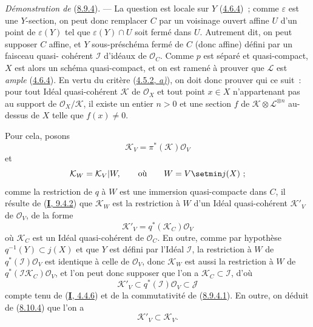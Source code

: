 \begin{env}[8.10.6]
\label{II.8.10.6-fr}
\emph{Démonstration de} (\hyperref[II.8.9.4-fr]{8.9.4}). --- La question est
locale sur $Y$ (\hyperref[II.4.6.4-fr]{4.6.4})~; comme $\varepsilon$ est une
$Y$-section, on peut donc remplacer $C$ par un voisinage ouvert affine $U$
d'un point de $\varepsilon(Y)$ tel que $\varepsilon(Y)\cap U$ soit fermé dans
$U$. Autrement dit, on peut supposer $C$ affine, et $Y$ sous-préschéma fermé
de $C$ (donc affine) défini par un faisceau quasi-%
cohérent $\mathcal{I}$ d'idéaux de $\mathcal{O}_C$. Comme $p$ est séparé et
quasi-compact, $X$ est alors un schéma quasi-compact, et on est ramené à
prouver que $\mathcal{L}$ est \emph{ample}
(\hyperref[II.4.6.4-fr]{4.6.4}). En vertu du critère
(\hyperref[II.4.5.2-fr]{4.5.2, \emph{a)}}), on doit donc prouver qui ce suit~: pour
tout Idéal quasi-cohérent $\mathcal{K}$ de $\mathcal{O}_X$ et tout point
$x\in X$ n'appartenant pas au support de $\mathcal{O}_X/\mathcal{K}$, il
existe un entier $n>0$ et une section $f$ de
$\mathcal{K}\otimes\mathcal{L}^{\otimes n}$ au-dessus de $X$ telle que
$f(x)\neq0$.

Pour cela, posons
\[
  \mathcal{K}_V=\pi^*(\mathcal{K})\mathcal{O}_V
\]
et
\[
  \mathcal{K}_W=\mathcal{K}_V|W,\qquad\hbox{où}\qquad W=V\setmin j(X)~;
\]
comme la restriction de $q$ à $W$ est une immersion quasi-compacte dans $C$,
il résulte de (\hyperref[I.9.4.2-fr]{\textbf{I}, 9.4.2}) que $\mathcal{K}_W$ est la
restriction à $W$ d'un Idéal quasi-cohérent $\mathcal{K}'_V$ de
$\mathcal{O}_V$, de la forme
\[
  \mathcal{K}'_V=q^*(\mathcal{K}_C)\mathcal{O}_V
\]
où $\mathcal{K}_C$ est un Idéal quasi-cohérent de $\mathcal{O}_C$. En outre,
comme par hypothèse $q^{-1}(Y)\subset j(X)$ et que $Y$ est défini par l'Idéal
$\mathcal{I}$, la restriction à $W$ de $q^*(\mathcal{I})\mathcal{O}_V$ est
identique à celle de $\mathcal{O}_V$, donc $\mathcal{K}_W$ est aussi la
restriction à $W$ de $q^*(\mathcal{I}\mathcal{K}_C)\mathcal{O}_V$, et l'on
peut donc supposer que l'on a $\mathcal{K}_C\subset\mathcal{I}$, d'où
\begin{equation}
\label{II.8.10.6.1-fr}
  \mathcal{K}'_V\subset q^*(\mathcal{I})\mathcal{O}_V\subset\mathcal{J}
\tag{8.10.6.1}
\end{equation}
compte tenu de (\hyperref[I.4.4.6-fr]{\textbf{I}, 4.4.6}) et de la commutativité de
(\hyperref[II.8.9.4.1-fr]{8.9.4.1}). En outre, on déduit de
(\hyperref[II.8.10.4-fr]{8.10.4}) que l'on a
\begin{equation}
\label{II.8.10.6.2-fr}
  \mathcal{K}'_V\subset\mathcal{K}_V.
\tag{8.10.6.2}
\end{equation}


\end{env}
